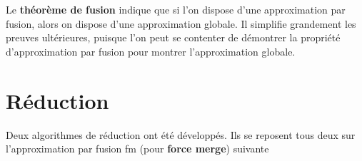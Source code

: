 Le \textbf{théorème de fusion} indique que si l'on dispose d'une approximation par fusion, alors on dispose d'une approximation globale. Il simplifie grandement les preuves ultérieures, puisque l'on peut se contenter de démontrer la propriété d'approximation par fusion pour montrer l'approximation globale.

\section{Réduction}

Deux algorithmes de réduction ont été développés. Ils se reposent tous deux sur l'approximation par fusion fm (pour \textbf{force merge}) suivante


